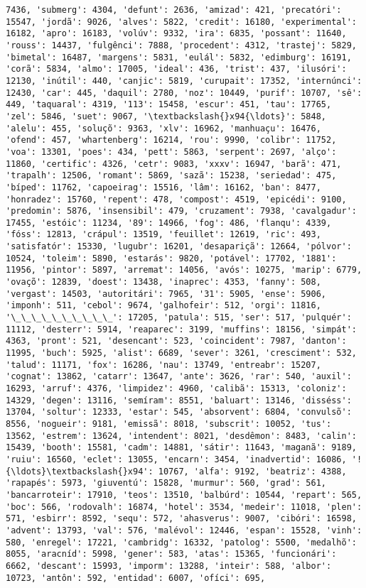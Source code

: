 \documentclass[11pt]{article}
\begin{document}
\begin{Verbatim}[commandchars=\\\{\}]
7436, 'submerg': 4304, 'defunt': 2636, 'amizad': 421, 'precatóri': 15547, 'jordã': 9026, 'alves': 5822, 'credit': 16180, 'experimental': 16182, 'apro': 16183, 'volúv': 9332, 'ira': 6835, 'possant': 11640, 'rouss': 14437, 'fulgênci': 7888, 'procedent': 4312, 'trastej': 5829, 'bimetal': 16487, 'margens': 5831, 'eulál': 5832, 'edimburg': 16191, 'corã': 5834, 'almo': 17005, 'ideal': 436, 'trist': 437, 'ilusóri': 12130, 'inútil': 440, 'canjic': 5819, 'curupait': 17352, 'internúnci': 12430, 'car': 445, 'daquil': 2780, 'noz': 10449, 'purif': 10707, 'sê': 449, 'taquaral': 4319, '113': 15458, 'escur': 451, 'tau': 17765, 'zel': 5846, 'suet': 9067, '\textbackslash{}x94{\ldots}': 5848, 'alelu': 455, 'soluçõ': 9363, 'xlv': 16962, 'manhuaçu': 16476, 'ofend': 457, 'whartenberg': 16214, 'rou': 9990, 'colibr': 11752, 'voa': 13301, 'poes': 434, 'pett': 5863, 'serpent': 2697, 'alço': 11860, 'certific': 4326, 'cetr': 9083, 'xxxv': 16947, 'barã': 471, 'trapalh': 12506, 'romant': 5869, 'sazã': 15238, 'seriedad': 475, 'bíped': 11762, 'capoeirag': 15516, 'lâm': 16162, 'ban': 8477, 'honradez': 15760, 'repent': 478, 'compost': 4519, 'epicédi': 9100, 'predomin': 5876, 'insensibil': 479, 'cruzament': 7938, 'cavalgadur': 17455, 'estóic': 11234, '89': 14966, 'fog': 486, 'flanqu': 4339, 'fóss': 12813, 'crápul': 13519, 'feuillet': 12619, 'ric': 493, 'satisfatór': 15330, 'lugubr': 16201, 'desapariçã': 12664, 'pólvor': 10524, 'toleim': 5890, 'estarás': 9820, 'potável': 17702, '1881': 11956, 'pintor': 5897, 'arremat': 14056, 'avós': 10275, 'marip': 6779, 'ovaçõ': 12839, 'doest': 13438, 'inaprec': 4353, 'fanny': 508, 'vergast': 14503, 'autoritári': 7965, '31': 5905, 'ense': 5906, 'imponh': 511, 'cebol': 9674, 'galhofeir': 512, 'orgi': 11816, '\_\_\_\_\_\_\_\_\_\_': 17205, 'patula': 515, 'ser': 517, 'pulquér': 11112, 'desterr': 5914, 'reaparec': 3199, 'muffins': 18156, 'simpát': 4363, 'pront': 521, 'desencant': 523, 'coincident': 7987, 'danton': 11995, 'buch': 5925, 'alist': 6689, 'sever': 3261, 'cresciment': 532, 'talud': 11171, 'fox': 16286, 'nau': 13749, 'entreabr': 15207, 'cognat': 13862, 'catarr': 13647, 'ante': 3626, 'rar': 540, 'auxil': 16293, 'arruf': 4376, 'limpidez': 4960, 'calibã': 15313, 'coloniz': 14329, 'degen': 13116, 'semíram': 8551, 'baluart': 13146, 'disséss': 13704, 'soltur': 12333, 'estar': 545, 'absorvent': 6804, 'convulsõ': 8556, 'nogueir': 9181, 'emissã': 8018, 'subscrit': 10052, 'tus': 13562, 'estrem': 13624, 'intendent': 8021, 'desdêmon': 8483, 'calin': 15439, 'booth': 15581, 'cadm': 14881, 'sátir': 11643, 'maganã': 9189, 'ruiu': 16560, 'eclet': 13055, 'encarn': 3454, 'inadvertid': 16086, '!{\ldots}\textbackslash{}x94': 10767, 'alfa': 9192, 'beatriz': 4388, 'rapapés': 5973, 'giuventú': 15828, 'murmur': 560, 'grad': 561, 'bancarroteir': 17910, 'teos': 13510, 'balbúrd': 10544, 'repart': 565, 'boc': 566, 'rodovalh': 16874, 'hotel': 3534, 'medeir': 11018, 'plen': 571, 'esbirr': 8592, 'sequ': 572, 'ahasverus': 9007, 'cibóri': 16598, 'advent': 13793, 'val': 576, 'malévol': 12446, 'espan': 15528, 'vinh': 580, 'enregel': 17221, 'cambridg': 16332, 'patolog': 5500, 'medalhõ': 8055, 'aracníd': 5998, 'gener': 583, 'atas': 15365, 'funcionári': 6662, 'descant': 15993, 'imporm': 13288, 'inteir': 588, 'albor': 10723, 'antôn': 592, 'entidad': 6007, 'ofíci': 695, 
\end{Verbatim}
\end{document}
